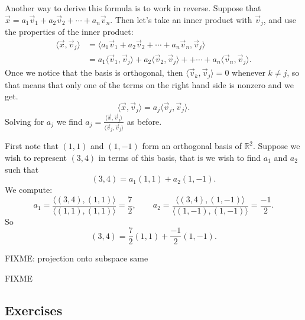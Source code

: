 Another way to derive this formula is to work in reverse.  Suppose that
$\vec{x} =
a_1 \vec{v}_1 + 
a_2 \vec{v}_2 + \cdots +
a_n \vec{v}_n$.  Then let's take an inner product with $\vec{v}_j$, and
use the properties of the inner product:
\begin{equation*}
\begin{split}
\langle \vec{x} , \vec{v}_j \rangle
& =
\langle a_1 \vec{v}_1 + 
a_2 \vec{v}_2 + \cdots +
a_n \vec{v}_n , \vec{v}_j \rangle
\\
& =
a_1 \langle \vec{v}_1 , \vec{v}_j \rangle + 
a_2 \langle \vec{v}_2 , \vec{v}_j \rangle + 
+ \cdots +
a_n \langle \vec{v}_n , \vec{v}_j \rangle .
\end{split}
\end{equation*}
Once we notice that the basis is orthogonal, then
$\langle \vec{v}_k , \vec{v}_j \rangle = 0$ whenever
$k \not= j$, so that means that only one of the terms on the right
hand side is nonzero and we get.
\begin{equation*}
\langle \vec{x} , \vec{v}_j \rangle
=
a_j \langle \vec{v}_j , \vec{v}_j \rangle .
\end{equation*}
Solving for $a_j$ we find $a_j =
\frac{\langle \vec{x}, \vec{v}_j \rangle}{
\langle \vec{v}_j, \vec{v}_j \rangle
}$ as before.

\begin{example}
First note that $(1,1)$ and $(1,-1)$ form an orthogonal basis of ${\mathbb{R}}^2$.
Suppose we wish to represent $(3,4)$ in terms of this basis,
that is we wish to find $a_1$ and $a_2$ such that
\begin{equation*}
(3,4) = a_1 (1,1) + a_2 (1,-1) .
\end{equation*}
We compute:
\begin{equation*}
a_1 = 
\frac{\langle (3,4), (1,1) \rangle}{
\langle (1,1), (1,1) \rangle
}
=
\frac{7}{2}, \qquad
a_2 = 
\frac{\langle (3,4), (1,-1) \rangle}{
\langle (1,-1), (1,-1) \rangle
}
=
\frac{-1}{2} .
\end{equation*}
So
\begin{equation*}
(3,4) = \frac{7}{2} (1,1) + \frac{-1}{2} (1,-1) .
\end{equation*}
\end{example}

FIXME: projection onto subspace same

FIXME

\subsection{Exercises}

